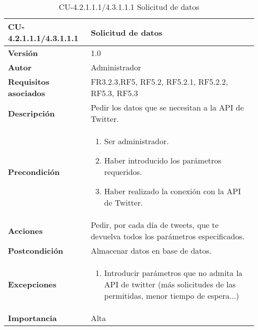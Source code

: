 \begin{table}[h!]
	\centering
	\begin{tabularx}{\linewidth}{ p{} p{} }
		\toprule
		\textbf{CU-4.2.1.1.1/4.3.1.1.1}    & \textbf{Solicitud de datos}\\
		\toprule
		\textbf{Versión}              & 1.0    \\
		\textbf{Autor}                & Administrador \\
		\textbf{Requisitos asociados} & FR3.2.3,RF5, RF5.2, RF5.2.1, RF5.2.2, RF5.3, RF5.3\\
		\textbf{Descripción}          & Pedir los datos que se necesitan a la API de Twitter.\\
        \textbf{Precondición}         &  
  	\begin{enumerate}
			\def\labelenumi{\arabic{enumi}.}
			\tightlist
			\item Ser administrador.
                \item Haber introducido los parámetros requeridos.
                \item Haber realizado la conexión con la API de Twitter.
		\end{enumerate}\\
		\textbf{Acciones}             & Pedir, por cada día de tweets, que te devuelva todos los parámetros especificados.\\
		\textbf{Postcondición}     &   Almacenar datos en base de datos. \\
		\textbf{Excepciones}          & 
        \begin{enumerate}
            \def\labelenumi{\arabic{enumi}.}
            \tightlist
            \item Introducir parámetros que no admita la API de twitter (más solicitudes de las permitidas, menor tiempo de espera...)
		\end{enumerate}\\
		\textbf{Importancia}          & Alta\\
		\bottomrule
	\end{tabularx}
	\caption{CU-4.2.1.1.1/4.3.1.1.1 Solicitud de datos}
\end{table}

